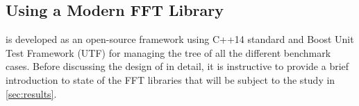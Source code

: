 

\subsection{Using a Modern FFT Library}

\gearshifft{} is developed as an open-source framework using C++14 standard and Boost Unit Test Framework (UTF) for managing the tree of all the different benchmark cases.
Before discussing the design of \gearshifft{} in detail, it is instructive to provide a brief introduction to state of the FFT libraries that will be subject to the study in \cref{sec:results}.

